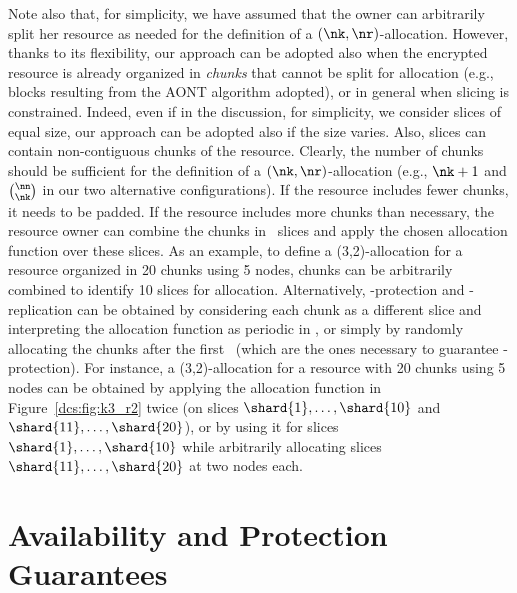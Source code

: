 Note also that, for simplicity, we have assumed that the owner can
arbitrarily split her resource as needed for the definition of a
$(\nk,\nr)$-allocation. However, thanks to its flexibility, our
approach can be adopted also when the encrypted resource is already
organized in {\em chunks} that cannot be split for allocation (e.g.,
blocks resulting from the AONT algorithm adopted), or in general when
slicing is constrained. Indeed, even if in the discussion, for
simplicity, we consider slices of equal size, our approach can be
adopted also if the size varies.  Also, slices can contain
non-contiguous chunks of the resource. Clearly, the number of chunks
should be sufficient for the definition of a $(\nk,\nr)$-allocation
(e.g., $\nk+1$ and $\binom{\nn}{\nk}$ in our two alternative
configurations). If the resource includes fewer chunks, it needs to be
padded. If the resource includes more chunks than necessary, the
resource owner can combine the chunks in \ns\ slices and apply the
chosen allocation function over these slices. As an example, to define
a (3,2)-allocation for a resource organized in 20 chunks using 5
nodes, chunks can be arbitrarily combined to identify 10 slices for
allocation. Alternatively, \nk-protection and \nr-replication can be
obtained by considering each chunk as a different slice and
interpreting the allocation function as periodic in \ns, or simply by
randomly allocating the chunks after the first \ns\ (which are the
ones necessary to guarantee \nk-protection). For instance, a
(3,2)-allocation for a resource with 20 chunks using 5 nodes can be
obtained by applying the allocation function in Figure~\ref{dcs:fig:k3_r2}
twice (on slices $\shard{1},\ldots,\shard{10}$ and
$\shard{11},\ldots,\shard{20}$), or by using it for slices
$\shard{1},\ldots,\shard{10}$ while arbitrarily allocating slices
$\shard{11},\ldots,\shard{20}$ at two nodes each.


\section[Guarantees]{Availability and Protection Guarantees}\label{dcs:sec:analysis}

